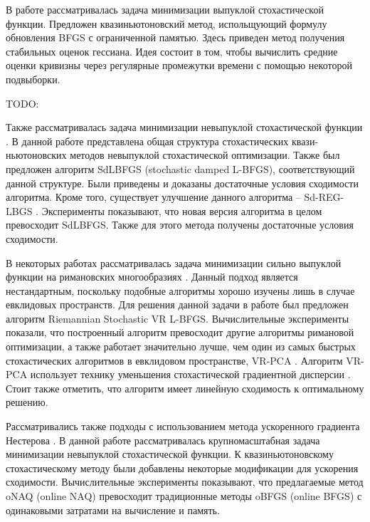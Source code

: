 \documentclass[]{scrartcl}
\begin{document}
В работе \cite{journals/siamjo/ByrdHNS16} рассматривалась задача минимизации выпуклой стохастической функции. Предложен квазиньютоновский метод, испольщующий формулу обновления BFGS с ограниченной памятью. Здесь приведен метод получения стабильных оценок гессиана. Идея состоит в том, чтобы вычислить средние оценки кривизны через регулярные промежутки времени с помощью некоторой подвыборки.

TODO:


Также рассматривалась задача минимизации невыпуклой стохастической функции \cite{journals/siamjo/WangMGL17}. В данной работе представлена общая структура стохастических квази-ньютоновских методов невыпуклой стохастической оптимизации. Также был предложен алгоритм SdLBFGS (stochastic damped L-BFGS), соответствующий данной структуре. Были приведены и доказаны достаточные условия сходимости алгоритма. Кроме того, существует улучшение данного алгоритма -- Sd-REG-LBGS \cite{journals/corr/abs-1912-04456}. Эксперименты показывают, что новая версия алгоритма в целом превосходит SdLBFGS. Также для этого метода получены достаточные условия сходимости.

В некоторых работах рассматривалась задача минимизации сильно выпуклой функции на римановских многообразиях \cite{journals/corr/RoychowdhuryP17}. Данный подход является нестандартным, поскольку подобные алгоритмы хорошо изучены лишь в случае евклидовых пространств. Для решения данной задачи в работе был предложен алгоритм Riemannian Stochastic VR L-BFGS. Вычислительные эксперименты показали, что построенный алгоритм превосходит другие алгоритмы римановой оптимизации, а также работает значительно лучше, чем один из самых быстрых стохастических алгоритмов в евклидовом пространстве, VR-PCA \cite{journals/corr/Shamir14b}. Алгоритм VR-PCA использует технику уменьшения стохастической градиентной дисперсии \cite{oai:repository.ust.hk:1783.1-98257}.  Стоит также  отметить, что алгоритм имеет линейную сходимость к оптимальному решению. 

Рассматривались также подходы с использованием метода ускоренного градиента Нестерова \cite{journals/corr/abs-1909-03621}. В данной работе рассматривалась крупномасштабная задача минимизации невыпуклой стохастической функции. К квазиньютоновскому стохастическому методу были добавлены некоторые модификации для ускорения сходимости. Вычислительные эксперименты показывают, что предлагаемые метод oNAQ (online NAQ)  превосходит традиционные методы oBFGS (online BFGS) \cite{journals/jmlr/SchraudolphYG07} с одинаковыми затратами на вычисление и память.
\end{document}
